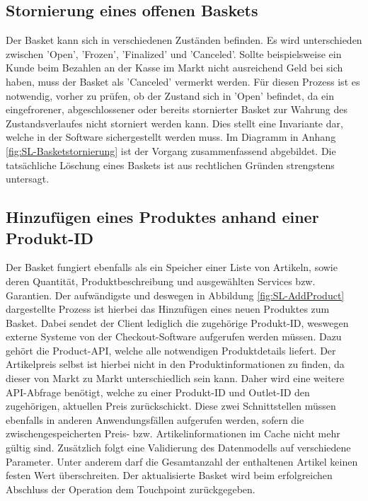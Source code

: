 \subsection{Stornierung eines offenen Baskets}

Der Basket kann sich in verschiedenen Zuständen befinden. Es wird unterschieden zwischen 'Open', 'Frozen', 'Finalized' und 'Canceled'. Sollte beispielsweise ein Kunde beim Bezahlen an der Kasse im Markt nicht ausreichend Geld bei sich haben, muss der Basket als 'Canceled' vermerkt werden. Für diesen Prozess ist es notwendig, vorher zu prüfen, ob der Zustand sich in 'Open' befindet, da ein eingefrorener, abgeschlossener oder bereits stornierter Basket zur Wahrung des Zustandsverlaufes nicht storniert werden kann. Dies stellt eine Invariante dar, welche in der Software sichergestellt werden muss. Im Diagramm in Anhang \ref{fig:SL-Basketstornierung} ist der Vorgang zusammenfassend abgebildet. Die tatsächliche Löschung eines Baskets ist aus rechtlichen Gründen strengstens untersagt. 

\pagebreak


\subsection{Hinzufügen eines Produktes anhand einer Produkt-ID}

Der Basket fungiert ebenfalls als ein Speicher einer Liste von Artikeln, sowie deren Quantität, Produktbeschreibung und ausgewählten Services bzw. Garantien. Der aufwändigste und deswegen in Abbildung \ref{fig:SL-AddProduct} dargestellte Prozess ist hierbei das Hinzufügen eines neuen Produktes zum Basket. Dabei sendet der Client lediglich die zugehörige Produkt-ID, weswegen externe Systeme von der Checkout-Software aufgerufen werden müssen. Dazu gehört die Product-API, welche alle notwendigen Produktdetails liefert. Der Artikelpreis selbst ist hierbei nicht in den Produktinformationen zu finden, da dieser von Markt zu Markt unterschiedlich sein kann. Daher wird eine weitere API-Abfrage benötigt, welche zu einer Produkt-ID und Outlet-ID den zugehörigen, aktuellen Preis zurückschickt. Diese zwei Schnittstellen müssen ebenfalls in anderen Anwendungsfällen aufgerufen werden, sofern die zwischengespeicherten Preis- bzw. Artikelinformationen im Cache nicht mehr gültig sind. Zusätzlich folgt eine Validierung des Datenmodells auf verschiedene Parameter. Unter anderem darf die Gesamtanzahl der enthaltenen Artikel keinen festen Wert überschreiten. Der aktualisierte Basket wird beim erfolgreichen Abschluss der Operation dem Touchpoint zurückgegeben.

